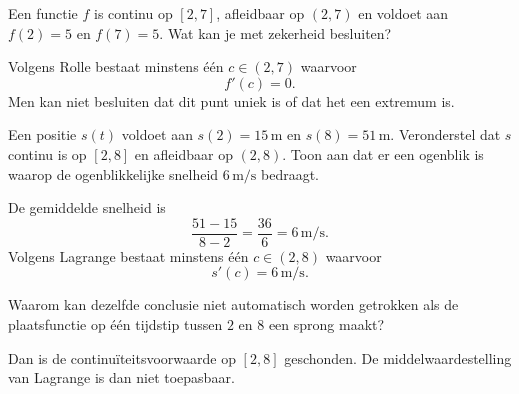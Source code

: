 \documentclass{ximera}
\begin{document}
\begin{oefening}{\oefU\ESS}
\begin{question}
Een functie \(f\) is continu op \([2,7]\), afleidbaar op \((2,7)\) en
voldoet aan \(f(2)=5\) en \(f(7)=5\). Wat kan je met zekerheid besluiten?

\begin{oplossing}
Volgens Rolle bestaat minstens één \(c\in(2,7)\) waarvoor
\[
\boxed{f'(c)=0}.
\]
Men kan niet besluiten dat dit punt uniek is of dat het een extremum is.
\end{oplossing}
\end{question}

\begin{question}
Een positie \(s(t)\) voldoet aan \(s(2)=15\,\mathrm m\) en
\(s(8)=51\,\mathrm m\). Veronderstel dat \(s\) continu is op \([2,8]\)
en afleidbaar op \((2,8)\). Toon aan dat er een ogenblik is waarop de
ogenblikkelijke snelheid \(6\,\mathrm{m/s}\) bedraagt.

\begin{oplossing}
De gemiddelde snelheid is
\[
\frac{51-15}{8-2}
=
\frac{36}{6}
=
6\,\mathrm{m/s}.
\]
Volgens Lagrange bestaat minstens één \(c\in(2,8)\) waarvoor
\[
s'(c)=6\,\mathrm{m/s}.
\]
\end{oplossing}
\end{question}

\begin{question}
Waarom kan dezelfde conclusie niet automatisch worden getrokken als de
plaatsfunctie op één tijdstip tussen \(2\) en \(8\) een sprong maakt?

\begin{oplossing}
Dan is de continuïteitsvoorwaarde op \([2,8]\) geschonden. De
middelwaardestelling van Lagrange is dan niet toepasbaar.
\end{oplossing}
\end{question}
\end{oefening}


\end{document}
